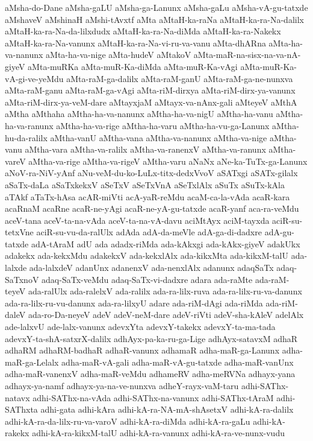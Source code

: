 {aMsha-do-Dane
aMsha-gaLU
aMsha-ga-Lanunx
aMsha-gaLu
aMsha-vA-gu-tatxde
aMshaveV
aMshinaH
aMshi-tAvxtf
aMta
aMtaH-ka-raNa
aMtaH-ka-ra-Na-dalilx
aMtaH-ka-ra-Na-da-lilxdudx
aMtaH-ka-ra-Na-diMda
aMtaH-ka-ra-Nakekx
aMtaH-ka-ra-Na-vanunx
aMtaH-ka-ra-Na-vi-ru-va-vanu
aMta-dhARna
aMta-ha-va-nanunx
aMta-ha-va-nige
aMta-hudeV
aMtakoV
aMta-maR-na-sisx-na-va-nA-giyeV
aMta-muRKa
aMta-muR-Ka-diMda
aMta-muR-Ka-vAgi
aMta-muR-Ka-vA-gi-ve-yeMdu
aMta-raM-ga-dalilx
aMta-raM-ganU
aMta-raM-ga-ne-nunxva
aMta-raM-ganu
aMta-raM-ga-vAgi
aMta-riM-dirxya
aMta-riM-dirx-ya-vanunx
aMta-riM-dirx-ya-veM-dare
aMtayxjaM
aMtayx-va-nAnx-gali
aMteyeV
aMthA
aMtha
aMthaha
aMtha-ha-va-nanunx
aMtha-ha-va-nigU
aMtha-ha-vanu
aMtha-ha-va-ranunx
aMtha-ha-va-rige
aMtha-ha-varu
aMtha-ha-vu-ga-Lanunx
aMtha-hu-da-ralilx
aMtha-vanU
aMtha-vana
aMtha-va-nanunx
aMtha-va-nige
aMtha-vanu
aMtha-vara
aMtha-va-ralilx
aMtha-va-ranenxV
aMtha-va-ranunx
aMtha-vareV
aMtha-va-rige
aMtha-va-rigeV
aMtha-varu
aNaNx
aNe-ka-TuTx-ga-Lanunx
aNoV-ra-NiV-yAnf
aNu-veM-du-ko-LuLx-titx-dedxVvoV
aSATxgi
aSATx-gilalx
aSaTx-daLa
aSaTxkekxV
aSeTxV
aSeTxVnA
aSeTxlAlx
aSuTx
aSuTx-kAla
aTAkf
aTaTx-hAsa
acAR-miVti
acA-yaR-reMdu
acaM-ca-la-vAda
acaR-kara
acaRnaM
acaRne
acaR-ne-yAgi
acaR-ne-yA-gu-tatxde
acaR-yanf
aca-ra-veMdu
aceV-tana
aceV-ta-na-vAda
aceV-ta-na-vA-davu
aciMtAyx
aciM-tayxda
aciR-su-tetxVne
aciR-su-vu-da-ralUlx
adAda
adA-da-meVle
adA-ga-di-dadxre
adA-gu-tatxde
adA-tAraM
adU
ada
adadx-riMda
ada-kAkxgi
ada-kAkx-giyeV
adakUkx
adakekx
ada-kekxMdu
adakekxV
ada-kekxlAlx
ada-kikxMta
ada-kikxM-talU
ada-lalxde
ada-lalxdeV
adanUnx
adanenxV
ada-nenxlAlx
adanunx
adaqSaTx
adaq-SaTxnoV
adaq-SaTx-veMdu
adaq-SaTx-vi-dadxre
adara
ada-raMte
ada-raM-teyeV
ada-ralUlx
ada-ralelxV
ada-ralilx
ada-ra-lilx-ruva
ada-ra-lilx-ru-va-danunx
ada-ra-lilx-ru-vu-danunx
ada-ra-lilxyU
adare
ada-riM-dAgi
ada-riMda
ada-riM-daleV
ada-ro-Da-neyeV
adeV
adeV-neM-dare
adeV-riVti
adeV-sha-kAleV
adelAlx
ade-lalxvU
ade-lalx-vanunx
adevxYta
adevxY-takekx
adevxY-ta-ma-tada
adevxY-ta-shA-satxrX-dalilx
adhAyx-pa-ka-ru-ga-Lige
adhAyx-satavxM
adhaR
adhaRM
adhaRM-badhaR
adhaR-vanunx
adhamaR
adha-maR-ga-Lanunx
adha-maR-ga-Lelalx
adha-maR-vA-gali
adha-maR-vA-gu-tatxde
adha-maR-vanUnx
adha-maR-vanenxV
adha-maR-veMdu
adhameRV
adha-meRVNa
adhayx-yana
adhayx-ya-namf
adhayx-ya-na-ve-nunxva
adheY-rayx-vaM-taru
adhi-SAThx-natavx
adhi-SAThx-na-vAda
adhi-SAThx-na-vanunx
adhi-SAThx-tAraM
adhi-SAThxta
adhi-gata
adhi-kAra
adhi-kA-ra-NA-mA-shAsetxV
adhi-kA-ra-dalilx
adhi-kA-ra-da-lilx-ru-va-varoV
adhi-kA-ra-diMda
adhi-kA-ra-gaLu
adhi-kA-rakekx
adhi-kA-ra-kikxM-talU
adhi-kA-ra-vanunx
adhi-kA-ra-ve-nunx-vudu
}
